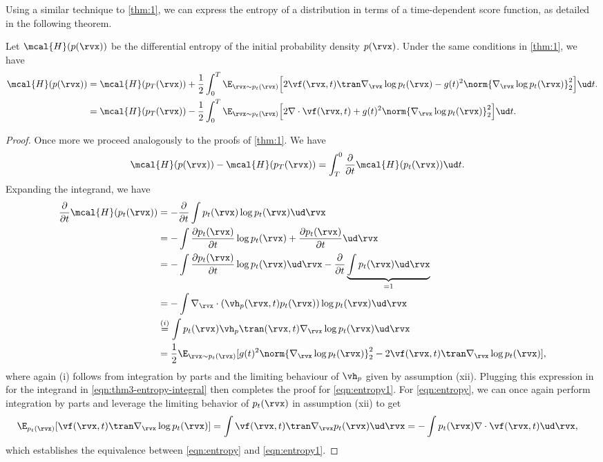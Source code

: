 Using a similar technique to \cref{thm:1}, we can express the entropy of a distribution in terms of a time-dependent score function, as detailed in the following theorem.
\begin{theorem}\label{thm:entropy}
Let $\mcal{H}(p(\rvx))$ be the differential entropy of the initial probability density $p(\rvx)$. Under the same conditions in \cref{thm:1}, we have
\begin{align}
    \mcal{H}(p(\rvx)) &= \mcal{H}(p_T(\rvx)) 
    + \frac{1}{2} \int_0^T \E_{\rvx \sim p_t(\rvx)}\Big[2 \vf(\rvx, t)\tran \nabla_\rvx \log p_t(\rvx) - g(t)^2 \norm{\nabla_\rvx \log p_t(\rvx)}_2^2\Big]\ud t.\label{eqn:entropy1}\\
    &= \mcal{H}(p_T(\rvx)) 
    - \frac{1}{2} \int_0^T \E_{\rvx \sim p_t(\rvx)}\Big[2 \nabla\cdot \vf(\rvx, t) + g(t)^2 \norm{\nabla_\rvx \log p_t(\rvx)}_2^2\Big]\ud t.
    \label{eqn:entropy}
\end{align}
\end{theorem}
\begin{proof}
Once more we proceed analogously to the proofs of \cref{thm:1}.
We have
\begin{align}
    &\mcal{H}(p(\rvx)) - \mcal{H}(p_T(\rvx)) 
    = \int_{T}^{0} \frac{\partial}{\partial t} \mcal{H}(p_{t}(\rvx)) \ud t.
    \label{eqn:thm3-entropy-integral}
\end{align}
Expanding the integrand, we have
\begin{align*}
    \frac{\partial}{\partial t} \mcal{H}(p_{t}(\rvx)) 
    &= - \frac{\partial}{\partial t} \int p_{t}(\rvx) \log p_{t}(\rvx) \ud \rvx \\
    &= - \int \frac{\partial p_{t}(\rvx)}{\partial t} \log p_{t}(\rvx) + \frac{\partial p_{t}(\rvx)}{\partial t} \ud \rvx \\
    &= - \int \frac{\partial p_{t}(\rvx)}{\partial t} \log p_{t}(\rvx) \ud \rvx - \frac{\partial }{\partial t} \underbrace{\int p_{t}(\rvx) \ud \rvx}_{= 1} \\
    &= - \int \nabla_\rvx \cdot (\vh_{p}(\rvx, t)p_t(\rvx)) \log p_{t}(\rvx) \ud \rvx \\
    &\stackrel{(i)}{=} \int p_t(\rvx) \vh_p\tran(\rvx,t) \nabla_{\rvx} \log p_{t}(\rvx) \ud \rvx \\
    &=  \frac{1}{2} \E_{\rvx \sim p_{t}(\rvx)} [ g(t)^2 \norm{\nabla_\rvx \log p_t(\rvx)}_2^2 - 2 \vf(\rvx, t)\tran \nabla_\rvx \log p_t(\rvx) ],
\end{align*}
where again (i) follows from integration by parts and the limiting behaviour of $ \vh_p $ given by assumption (xii).
Plugging this expression in for the integrand in \cref{eqn:thm3-entropy-integral} then completes the proof for \cref{eqn:entropy1}. For \cref{eqn:entropy}, we can once again perform integration by parts and leverage the limiting behavior of $p_t(\rvx)$ in assumption (xii) to get
\begin{align*}
    \E_{p_t(\rvx)}[\vf(\rvx, t)\tran \nabla_\rvx \log p_t(\rvx)] &= \int \vf(\rvx, t)\tran \nabla_\rvx p_t(\rvx) \ud \rvx
    = -\int p_t(\rvx) \nabla\cdot \vf(\rvx, t) \ud \rvx,
\end{align*}
which establishes the equivalence between \cref{eqn:entropy} and \cref{eqn:entropy1}.
\end{proof}

